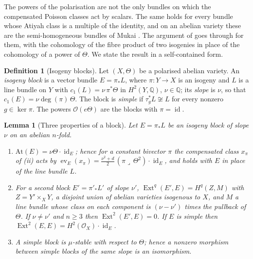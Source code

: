 \documentclass[11pt,reqno]{amsart}
\theoremstyle{plain}
\newtheorem{lemma}[theorem]{Lemma}
\theoremstyle{definition}
\newtheorem{definition}[theorem]{Definition}
\theoremstyle{remark}
\newcommand{\QQ}{\mathbb{Q}}
\newcommand{\cO}{\mathcal{O}}
\DeclareMathOperator{\Ext}{Ext}
\DeclareMathOperator{\id}{id}
\begin{document}
The powers of the polarisation are not the only bundles on which the
compensated Poisson classes act by scalars. The same holds for every bundle
whose Atiyah class is a multiple of the identity, and on an abelian variety
these are the semi-homogeneous bundles of Mukai \cite{Muk78}. The argument of
 goes through for them, with the cohomology of the fibre
product of two isogenies in place of the cohomology of a power of $\Theta$.
We state the result in a self-contained form.

\begin{definition}[Isogeny blocks]\label{def:block}
Let $(X,\Theta)$ be a polarised abelian variety. An \emph{isogeny block} is a
vector bundle $E=\pi_{*}L$, where $\pi\colon Y\to X$ is an isogeny and $L$ is
a line bundle on $Y$ with $c_{1}(L)=\nu\,\pi^{*}\Theta$ in $H^{2}(Y,\QQ)$,
$\nu\in\QQ$; its \emph{slope} is $\nu$, so that $c_{1}(E)=\nu\deg(\pi)\,\Theta$.
The block is \emph{simple} if $\tau_{g}^{*}L\not\cong L$ for every nonzero
$g\in\ker\pi$. The powers $\cO(e\Theta)$ are the blocks with $\pi=\id$.
\end{definition}

\begin{lemma}[Three properties of a block]\label{lem:blocks}
Let $E=\pi_{*}L$ be an isogeny block of slope $\nu$ on an abelian $n$-fold.
\begin{enumerate}[label=\textup{(\roman*)},nosep]
\item $\mathrm{At}(E)=\nu\Theta\cdot\id_{E}$; hence for a constant bivector
  $\pi$ the compensated class $x_{\pi}$ of (ii) acts by
  $\operatorname{ev}_{E}(x_{\pi})=\tfrac{\nu^{2}+d}{2}\,(\pi\lrcorner\,\Theta^{2})\cdot\id_{E}$,
  and  holds with $E$ in place of the line bundle $L$.
\item For a second block $E'=\pi'_{*}L'$ of slope $\nu'$,
  $\Ext^{q}(E',E)=H^{q}(Z,M)$ with $Z=Y'\times_{X}Y$, a disjoint union of
  abelian varieties isogenous to $X$, and $M$ a line bundle whose class on
  each component is $(\nu-\nu')$ times the pullback of $\Theta$. If
  $\nu\ne\nu'$ and $n\ge3$ then $\Ext^{2}(E',E)=0$. If $E$ is simple then
  $\Ext^{2}(E,E)=H^{2}(\cO_{X})\cdot\id_{E}$.
\item A simple block is $\mu$-stable with respect to $\Theta$; hence a
  nonzero morphism between simple blocks of the same slope is an
  isomorphism.
\end{enumerate}
\end{lemma}
\end{document}
